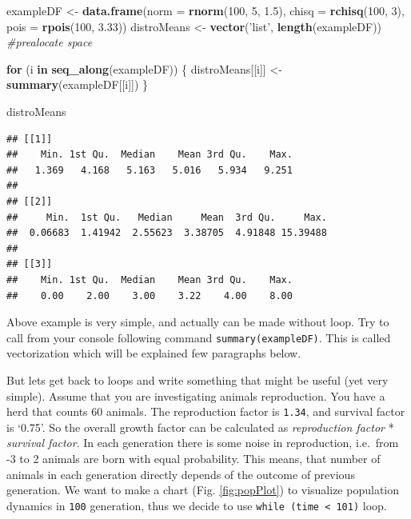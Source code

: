 \documentclass[]{book}
\newenvironment{Shaded}{\begin{snugshade}}{\end{snugshade}}
\newcommand{\KeywordTok}[1]{\textcolor[rgb]{0.13,0.29,0.53}{\textbf{#1}}}
\newcommand{\DataTypeTok}[1]{\textcolor[rgb]{0.13,0.29,0.53}{#1}}
\newcommand{\DecValTok}[1]{\textcolor[rgb]{0.00,0.00,0.81}{#1}}
\newcommand{\FloatTok}[1]{\textcolor[rgb]{0.00,0.00,0.81}{#1}}
\newcommand{\StringTok}[1]{\textcolor[rgb]{0.31,0.60,0.02}{#1}}
\newcommand{\CommentTok}[1]{\textcolor[rgb]{0.56,0.35,0.01}{\textit{#1}}}
\newcommand{\ControlFlowTok}[1]{\textcolor[rgb]{0.13,0.29,0.53}{\textbf{#1}}}
\newcommand{\NormalTok}[1]{#1}
\theoremstyle{definition}
\theoremstyle{definition}
\theoremstyle{definition}
\theoremstyle{remark}
\begin{document}
\begin{Shaded}
\begin{Highlighting}[]
\NormalTok{exampleDF <-}\StringTok{ }\KeywordTok{data.frame}\NormalTok{(}\DataTypeTok{norm =} \KeywordTok{rnorm}\NormalTok{(}\DecValTok{100}\NormalTok{, }\DecValTok{5}\NormalTok{, }\FloatTok{1.5}\NormalTok{),}
                        \DataTypeTok{chisq =} \KeywordTok{rchisq}\NormalTok{(}\DecValTok{100}\NormalTok{, }\DecValTok{3}\NormalTok{),}
                        \DataTypeTok{pois =} \KeywordTok{rpois}\NormalTok{(}\DecValTok{100}\NormalTok{, }\FloatTok{3.33}\NormalTok{))}
\NormalTok{distroMeans <-}\StringTok{ }\KeywordTok{vector}\NormalTok{(}\StringTok{'list'}\NormalTok{, }\KeywordTok{length}\NormalTok{(exampleDF)) }\CommentTok{#prealocate space}

\ControlFlowTok{for}\NormalTok{ (i }\ControlFlowTok{in} \KeywordTok{seq_along}\NormalTok{(exampleDF)) \{}
\NormalTok{  distroMeans[[i]] <-}\StringTok{ }\KeywordTok{summary}\NormalTok{(exampleDF[[i]])}
\NormalTok{\}}

\NormalTok{distroMeans}
\end{Highlighting}
\end{Shaded}

\begin{verbatim}
## [[1]]
##    Min. 1st Qu.  Median    Mean 3rd Qu.    Max. 
##   1.369   4.168   5.163   5.016   5.934   9.251 
## 
## [[2]]
##     Min.  1st Qu.   Median     Mean  3rd Qu.     Max. 
##  0.06683  1.41942  2.55623  3.38705  4.91848 15.39488 
## 
## [[3]]
##    Min. 1st Qu.  Median    Mean 3rd Qu.    Max. 
##    0.00    2.00    3.00    3.22    4.00    8.00
\end{verbatim}

Above example is very simple, and actually can be made without loop. Try
to call from your console following command \texttt{summary(exampleDF)}.
This is called vectorization which will be explained few paragraphs
below.

But lets get back to loops and write something that might be useful (yet
very simple). Assume that you are investigating animals reproduction.
You have a herd that counts 60 animals. The reproduction factor is
\texttt{1.34}, and survival factor is `0.75'. So the overall growth
factor can be calculated as \emph{reproduction factor} * \emph{survival
factor}. In each generation there is some noise in reproduction,
i.e.~from -3 to 2 animals are born with equal probability. This means,
that number of animals in each generation directly depends of the
outcome of previous generation. We want to make a chart (Fig.
\ref{fig:popPlot}) to visualize population dynamics in \texttt{100}
generation, thus we decide to use
\texttt{while\ (time\ \textless{}\ 101)} loop.
\end{document}
